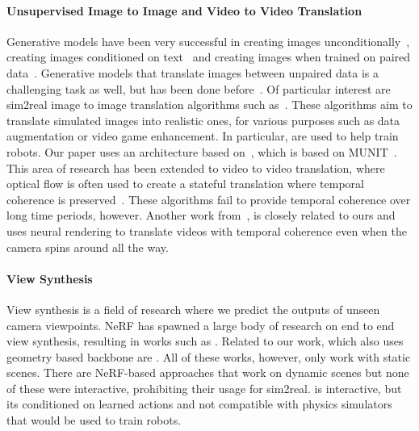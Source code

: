 \documentclass{article}
\begin{document}
\paragraph{Unsupervised Image to Image and Video to Video Translation}
Generative models have been very successful in creating images unconditionally~\cite{gan,stylegan}, creating images conditioned on text~\cite{dalle,imagen} and creating images when trained on paired data~\cite{pixtopix}.
Generative models that translate images between unpaired data is a challenging task as well, but has been done before~\cite{dual_diffusion,cyclegan,munit,unit}.
Of particular interest are sim2real image to image translation algorithms such as~\cite{retina_gan,rl_cyclegan,surgical_image_translation,enhancing_photorealism_enhancement}. These algorithms aim to translate simulated images into realistic ones, for various purposes such as data augmentation or video game enhancement. In particular, \citet{retina_gan,rl_cyclegan} are used to help train robots. Our paper uses an architecture based on~\citet{surgical_image_translation}, which is based on MUNIT~\cite{munit}.
This area of research has been extended to video to video translation, where optical flow is often used to create a stateful translation where temporal coherence is preserved~\cite{tecogan,mocyclegan}. These algorithms fail to provide temporal coherence over long time periods, however. Another work from~\citet{surgical_video_translation}, is closely related to ours and uses neural rendering to translate videos with temporal coherence even when the camera spins around all the way.

\vspace{-8pt}
\paragraph{View Synthesis}
View synthesis is a field of research where we predict the outputs of unseen camera viewpoints. NeRF \cite{nerf} has spawned a large body of research on end to end view synthesis, resulting in works such as \cite{nerv,fast_nerf,barf}. Related to our work, which also uses geometry based backbone are \cite{free_view_synthesis,stable_view_synthesis,ners}. All of these works, however, only work with static scenes. There are NeRF-based approaches that work on dynamic scenes \cite{dnerf,nerfies,nerualradianceflow} but none of these were interactive, prohibiting their usage for sim2real. \citet{playable_environments} is interactive, but its conditioned on learned actions and not compatible with physics simulators that would be used to train robots.
\end{document}
